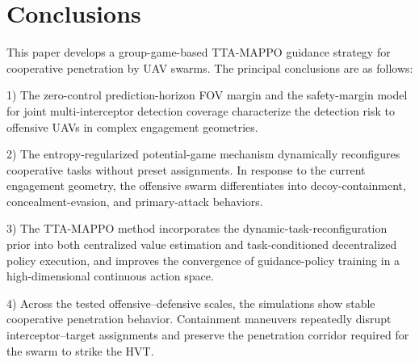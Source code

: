 \documentclass{cja}
\begin{document}
\section{Conclusions}
\label{sec:conclusion}

This paper develops a group-game-based TTA-MAPPO guidance strategy for cooperative penetration by UAV swarms. The principal conclusions are as follows:

1) The zero-control prediction-horizon FOV margin and the safety-margin model for joint multi-interceptor detection coverage characterize the detection risk to offensive UAVs in complex engagement geometries.

2) The entropy-regularized potential-game mechanism dynamically reconfigures cooperative tasks without preset assignments. In response to the current engagement geometry, the offensive swarm differentiates into decoy-containment, concealment-evasion, and primary-attack behaviors.

3) The TTA-MAPPO method incorporates the dynamic-task-reconfiguration prior into both centralized value estimation and task-conditioned decentralized policy execution, and improves the convergence of guidance-policy training in a high-dimensional continuous action space.

4) Across the tested offensive--defensive scales, the simulations show stable cooperative penetration behavior. Containment maneuvers repeatedly disrupt interceptor--target assignments and preserve the penetration corridor required for the swarm to strike the HVT.
\end{document}
